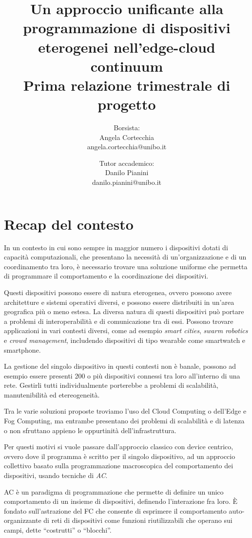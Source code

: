 \documentclass[13pt, a4paper]{article}
\title{\LARGE
    Un approccio unificante alla programmazione di dispositivi eterogenei nell'edge-cloud continuum \\ \small Prima relazione trimestrale di progetto
}
\author{
   Borsista: \\Angela Cortecchia \\ \small angela.cortecchia@unibo.it
    \and
    Tutor accademico: \\Danilo Pianini \\ \small danilo.pianini@unibo.it
}
\begin{document}
\maketitle
\clearpage


\section{Recap del contesto}
\label{sec:context}
In un contesto in cui sono sempre in maggior numero i dispositivi dotati di capacità computazionali,
che presentano la necessità di un'organizzazione e di un coordinamento tra loro,
è necessario trovare una soluzione uniforme che permetta di programmare il comportamento e la coordinazione dei dispositivi.

Questi dispositivi possono essere di natura eterogenea, ovvero possono avere architetture e sistemi operativi diversi,
e possono essere distribuiti in un'area geografica più o meno estesa.
%
La diversa natura di questi dispositivi può portare a problemi di interoperabilità e di comunicazione tra di essi.
%
Possono trovare applicazioni in vari contesti diversi, come ad esempio \emph{smart cities}, \emph{swarm robotics} e \emph{crowd management},
includendo dispositivi di tipo wearable come smartwatch e smartphone.

La gestione del singolo dispositivo in questi contesti non è banale, possono ad esempio essere presenti 200 o più dispositivi
connessi tra loro all'interno di una rete.
%
Gestirli tutti individualmente porterebbe a problemi di scalabilità, manutenibilità ed etereogeneità.

Tra le varie soluzioni proposte troviamo l'uso del Cloud Computing o dell'Edge e Fog Computing,
ma entrambe presentano dei problemi di scalabilità e di latenza o non sfruttano appieno le oppurtinità dell'infrastruttura.

Per questi motivi si vuole passare dall'approccio classico con device centrico, ovvero dove il programma è scritto per il singolo dispositivo,
ad un approccio collettivo basato sulla programmazione macroscopica del comportamento dei dispositivi,
usando tecniche di \emph{\ac{AC}}.

\ac{AC} è un paradigma di programmazione che permette di definire un unico comportamento di un insieme di dispositivi,
definendo l'interazione fra loro.
%
È fondato sull'astrazione del \ac{FC} che consente di esprimere il comportamento auto-organizzante di reti
di dispositivi come funzioni riutilizzabili che operano sui campi, dette ``costrutti'' o ``blocchi''.
\end{document}
